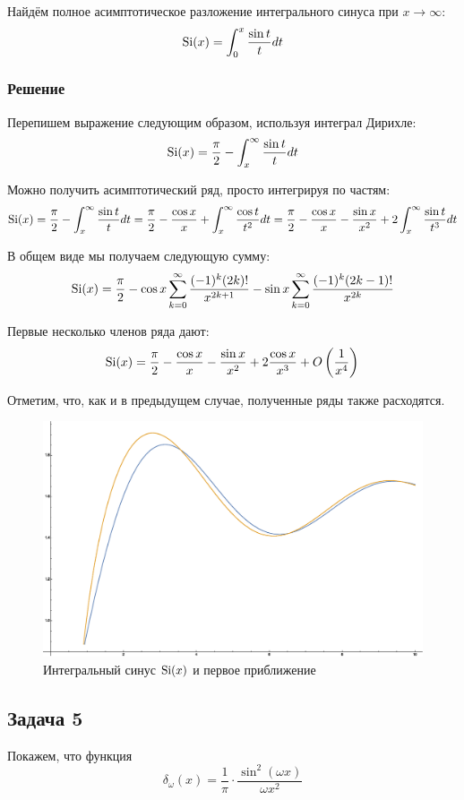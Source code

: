 \documentclass[a4paper,12pt]{article}
\begin{document}
Найдём полное асимптотическое разложение интегрального синуса при
$x\to\infty$:
\[
{\rm Si}(x)=\int_{0}^{x}\frac{\sin t}{t}dt
\]



\subsubsection*{Решение}

Перепишем выражение следующим образом, используя интеграл Дирихле:
\[
{\rm Si}(x)=\frac{\pi}{2}-\int_{x}^{\infty}\frac{\sin t}{t}dt
\]

\noindent
Можно получить асимптотический ряд, просто интегрируя по частям:
\[
{\rm Si}(x)=\frac{\pi}{2}-\int_{x}^{\infty}\frac{\sin t}{t}dt=\frac{\pi}{2}-\frac{\cos x}{x}+\int_{x}^{\infty}\frac{\cos t}{t^{2}}dt=\frac{\pi}{2}-\frac{\cos x}{x}-\frac{\sin x}{x^{2}}+2\int_{x}^{\infty}\frac{\sin t}{t^{3}}dt
\]

\noindent
В общем виде мы получаем следующую сумму:
\[
{\rm Si}(x)=\frac{\pi}{2}-\cos x\sum_{k=0}^{\infty}\frac{(-1)^{k}(2k)!}{x^{2k+1}}-\sin x\sum_{k=0}^{\infty}\frac{(-1)^{k}(2k-1)!}{x^{2k}}
\]

\noindent
Первые несколько членов ряда дают:
\[
{\rm Si}(x)=\frac{\pi}{2}-\frac{\cos x}{x}-\frac{\sin x}{x^{2}}+2\frac{\cos x}{x^{3}}+O\left(\frac{1}{x^{4}}\right)
\]

\noindent
Отметим, что, как и в предыдущем случае, полученные ряды также расходятся.

\begin{figure}[h]
\caption{Интегральный синус ${\rm Si}(x)$ и первое приближение}
\centering
\includegraphics[width=0.65\columnwidth]{sinintegral.eps}
\end{figure}


\subsection*{Задача 5}

Покажем, что функция 
\[
\delta_{\omega}(x)=\frac{1}{\pi}\cdot\frac{\sin^{2}(\omega x)}{\omega x^{2}}
\]
\end{document}
